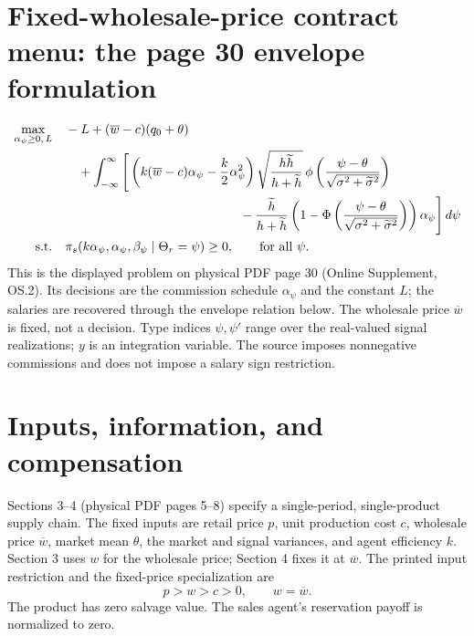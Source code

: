 \documentclass{article}
\begin{document}
\section*{Fixed-wholesale-price contract menu: the page 30 envelope formulation}

\begin{equation*}
\begin{aligned}
\max_{\alpha_\psi\geq 0,\,L}\quad
&-L+(\overline w-c)(q_0+\theta)\\
&\quad+\int_{-\infty}^{\infty}\Bigg[
\left(k(\overline w-c)\alpha_\psi-\frac{k}{2}\alpha_\psi^2\right)
\sqrt{\frac{h\widetilde h}{h+\widetilde h}}\,
\phi\left(\frac{\psi-\theta}{\sqrt{\sigma^2+\widetilde\sigma^2}}\right)\\
&\hspace{48mm}-\frac{\widetilde h}{h+\widetilde h}
\left(1-\Phi\left(\frac{\psi-\theta}{\sqrt{\sigma^2+\widetilde\sigma^2}}\right)\right)\alpha_\psi
\Bigg]\,d\psi\\
\text{s.t.}\quad
&\pi_s(k\alpha_\psi,\alpha_\psi,\beta_\psi\mid\Theta_r=\psi)\geq 0,
\qquad\text{for all }\psi.
\end{aligned}
\end{equation*}
This is the displayed problem on physical PDF page 30 (Online Supplement, OS.2). Its decisions are the commission schedule \(\alpha_\psi\) and the constant \(L\); the salaries are recovered through the envelope relation below. The wholesale price \(\overline w\) is fixed, not a decision. Type indices \(\psi,\psi'\) range over the real-valued signal realizations; \(y\) is an integration variable. The source imposes nonnegative commissions and does not impose a salary sign restriction.

\section*{Inputs, information, and compensation}

Sections 3--4 (physical PDF pages 5--8) specify a single-period, single-product supply chain. The fixed inputs are retail price \(p\), unit production cost \(c\), wholesale price \(\overline w\), market mean \(\theta\), the market and signal variances, and agent efficiency \(k\). Section 3 uses \(w\) for the wholesale price; Section 4 fixes it at \(\overline w\). The printed input restriction and the fixed-price specialization are
\[
p>w>c>0,\qquad w=\overline w.
\]
The product has zero salvage value. The sales agent's reservation payoff is normalized to zero.
\end{document}
